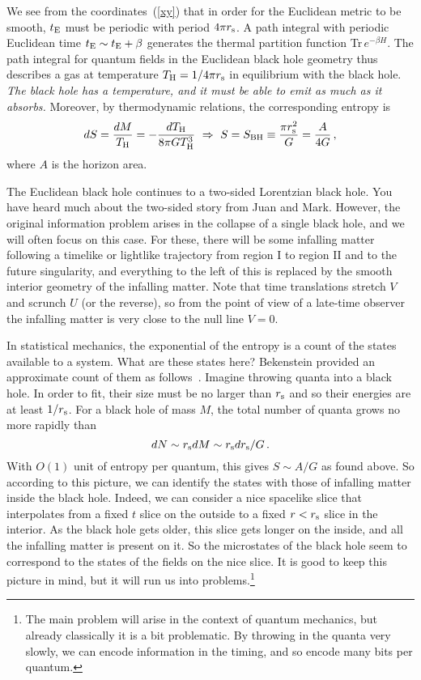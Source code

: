 \documentclass[12pt]{article}
\newcommand{\be}{\begin{equation}}
\newcommand{\ee}{\end{equation}}
\newcommand{\rmx}{\rm}
\newcommand{\rs}{r_{\rmx s}}
\begin{document}
We see from the coordinates~(\ref{xy}) that in order for the Euclidean metric to be smooth, $t_{\rm E}$ must be periodic with period $4\pi r_{\rmx s}$.  A path integral with periodic Euclidean time $t_{\rm E} \sim t_{\rm E} + \beta$ generates the thermal partition function Tr$\,e^{-\beta H}$.
The  path integral for quantum fields in the Euclidean black hole geometry thus describes a gas at temperature $T_{\rmx H} = 1/4\pi r_{\rmx s}$ in equilibrium with the black hole.  
{\it The black hole has a temperature, and it must be able to emit as much as it absorbs.}  Moreover, by thermodynamic relations, the corresponding entropy is
\be
dS = \frac{dM}{T_{\rmx H}} = -\frac{dT_{\rmx H}}{8\pi G  T_{\rmx H}^3} \ \Rightarrow\ S = S_{\rmx BH} \equiv \frac{\pi r_{\rmx s}^2}{G} = \frac{A}{4G} \,,
\ee
where $A$ is the horizon area.

The Euclidean black hole continues to a two-sided Lorentzian black hole.
You have heard much about the two-sided story from Juan and Mark.  However, the original information problem arises in the collapse of a single black hole, and we will often focus on this case.
For these, there will be some infalling matter following a timelike or lightlike trajectory from region I to region II and to the future singularity, and everything to the left of this is replaced by the smooth interior geometry of the infalling matter.  Note that time translations stretch $V$ and scrunch $U$ (or the reverse), so from the point of view of a late-time observer the infalling matter is very close to the null line $V=0$.

In statistical mechanics, the exponential of the entropy is a count of the states available to a system.  What are these states here?  Bekenstein provided an approximate count of them as follows~\cite{Bekenstein:1973ur}.  Imagine throwing quanta into a black hole.  In order to fit, their size must be no larger than $\rs$ and so their energies are at least $1/\rs$.  For a black hole of mass $M$, the total number of quanta grows no more rapidly than 
\be
dN \sim \rs dM \sim \rs d\rs/G  \,.
\ee
With $O(1)$ unit of entropy per quantum, this gives $S \sim A/G$ as found above.  So according to this picture, we can identify the states with those of infalling matter inside the black hole.  Indeed, we can consider a nice spacelike slice that interpolates from a fixed $t$ slice on the outside to a fixed $r < \rs$ slice in the interior.  As the black hole gets older, this slice gets longer on the inside, and all the infalling matter is present on it.  So the microstates of the black hole seem to correspond to the states of the fields on the nice slice.  It is good to keep this picture in mind, but it will run us into problems.\footnote{The main problem will arise in the context of quantum mechanics, but already classically it is a bit problematic.  By throwing in the quanta very slowly, we can encode information in the timing, and so encode many bits per quantum.}
\end{document}
